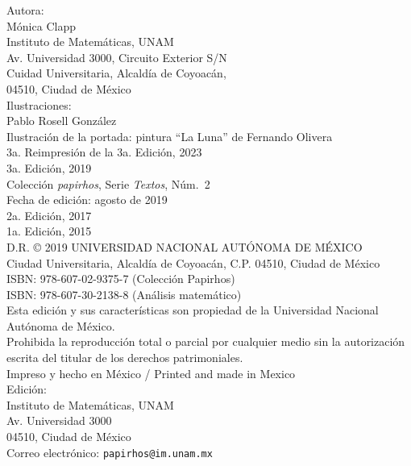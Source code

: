 \documentclass[10pt,pagesize]{scrbook}
\numberwithin{equation}{chapter}
\begin{document}
{\begin{flushleft}
  Autora:\\
Mónica Clapp\\
{\scriptsize \hspace{2ex}Instituto de Matemáticas, UNAM\\
\hspace{2ex}Av. Universidad 3000, Circuito Exterior S/N\\ 
\hspace{2ex}Cuidad Universitaria, Alcaldía de Coyoacán,\\ 
\hspace{2ex}04510, Ciudad de México\\[5ex]}
Ilustraciones:\\
Pablo Rosell González\\[1ex]
Ilustración de la portada: pintura ``La Luna'' de Fernando Olivera\\[5ex]  
\vspace*{2ex}
  3a. Reimpresión de la 3a. Edición, 2023\\[2pt]
3a. Edición, 2019\\
Colección \emph{papirhos}, Serie \emph{Textos}, Núm.~2\\
Fecha de edición: agosto de 2019\\[2ex]
2a. Edición, 2017\\
1a. Edición, 2015\\[2ex]
D.R. © 2019 UNIVERSIDAD NACIONAL AUTÓNOMA DE MÉXICO\\ 
\hspace{3.15em}Ciudad Universitaria, Alcaldía de Coyoacán, C.P. 04510, Ciudad de México
\\[2ex]
  ISBN: 978-607-02-9375-7 (Colección Papirhos)\\
  ISBN: 978-607-30-2138-8 (Análisis matemático)\\[2ex]
  Esta edición y sus características son propiedad de la Universidad Nacional Autónoma de México.\\
  Prohibida la reproducción total o parcial por cualquier medio sin la autorización escrita del titular de los derechos patrimoniales.\\[2ex]
  Impreso y hecho en México / Printed and made in Mexico\\[2ex]
  Edición:\\
  Instituto de Matemáticas, UNAM\\
  {\scriptsize Av. Universidad 3000\\
  04510, Ciudad de México\\[2ex]}
  Correo electrónico: \texttt{papirhos@im.unam.mx}
\end{flushleft}}
\end{document}
